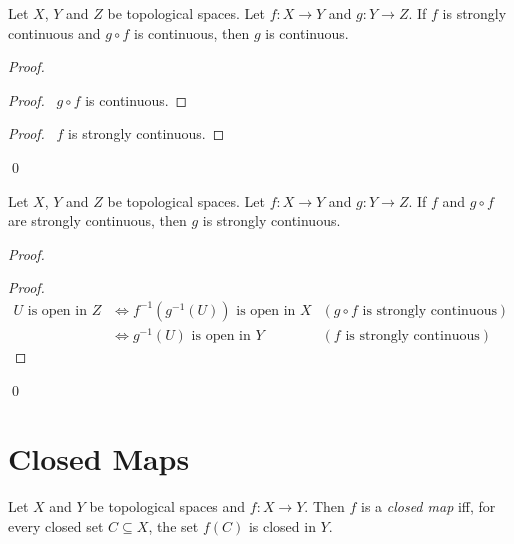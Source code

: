 \begin{prop}
  Let $X$, $Y$ and $Z$ be topological spaces.
  Let $f : X \rightarrow Y$ and $g : Y \rightarrow Z$. If $f$ is strongly
  continuous and $g \circ f$ is continuous, then $g$ is continuous.
\end{prop}

\begin{proof}
  \pf
  \begin{proof}
    \pf\ $g \circ f$ is continuous.
  \end{proof}
  \begin{proof}
    \pf\ $f$ is strongly continuous.
  \end{proof}
  \qed
\end{proof}

\begin{prop}
  Let $X$, $Y$ and $Z$ be topological spaces. Let $f : X \rightarrow Y$ and
  $g
  : Y \rightarrow Z$. If $f$ and $g \circ f$ are strongly continuous, then
  $g$
  is
  strongly continuous.
\end{prop}

\begin{proof}
  \pf
  \begin{proof}
    \pf
    \begin{align*}
      U \text{ is open in } Z & \Leftrightarrow f^{-1}(g^{-1}(U)) \text{ is
        open in } X & (g \circ f \text{ is strongly continuous}) \\
      & \Leftrightarrow g^{-1}(U) \text{ is open in } Y & (f \text{ is
        strongly continuous})
    \end{align*}
  \end{proof}
  \qed
\end{proof}

\section{Closed Maps}

\begin{df}
  Let $X$ and $Y$ be topological spaces and $f : X \rightarrow Y$. Then $f$
  is
  a \emph{closed map} iff, for every closed set $C \subseteq X$, the
  set $f(C)$ is closed in $Y$.
\end{df}


